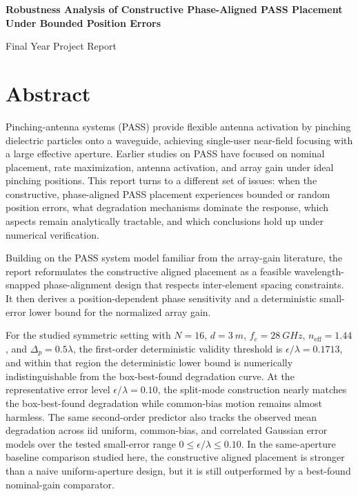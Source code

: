 \thispagestyle{plain}
\begin{center}
\vspace*{0.22\textheight}
{\LARGE\bfseries Robustness Analysis of Constructive Phase-Aligned PASS Placement Under Bounded Position Errors\par}
\vspace{1.5em}
{\large Final Year Project Report\par}
\vfill
\end{center}

\clearpage
\section*{Abstract}

Pinching-antenna systems (PASS) provide flexible antenna activation by pinching dielectric particles onto a waveguide, achieving single-user near-field focusing with a large effective aperture. Earlier studies on PASS have focused on nominal placement, rate maximization, antenna activation, and array gain under ideal pinching positions. This report turns to a different set of issues: when the constructive, phase-aligned PASS placement experiences bounded or random position errors, what degradation mechanisms dominate the response, which aspects remain analytically tractable, and which conclusions hold up under numerical verification.

Building on the PASS system model familiar from the array-gain literature, the report reformulates the constructive aligned placement as a feasible wavelength-snapped phase-alignment design that respects inter-element spacing constraints. It then derives a position-dependent phase sensitivity and a deterministic small-error lower bound for the normalized array gain.

For the studied symmetric setting with $N = 16$, $d = \SI{3}{m}$, $f_c = \SI{28}{GHz}$, $n_{\mathrm{eff}} = 1.44$, and $\Delta_p = 0.5\lambda$, the first-order deterministic validity threshold is $\epsilon/\lambda = 0.1713$, and within that region the deterministic lower bound is numerically indistinguishable from the box-best-found degradation curve. At the representative error level $\epsilon/\lambda = 0.10$, the split-mode construction nearly matches the box-best-found degradation while common-bias motion remains almost harmless. The same second-order predictor also tracks the observed mean degradation across iid uniform, common-bias, and correlated Gaussian error models over the tested small-error range $0 \le \epsilon/\lambda \le 0.10$. In the same-aperture baseline comparison studied here, the constructive aligned placement is stronger than a naive uniform-aperture design, but it is still outperformed by a best-found nominal-gain comparator.

